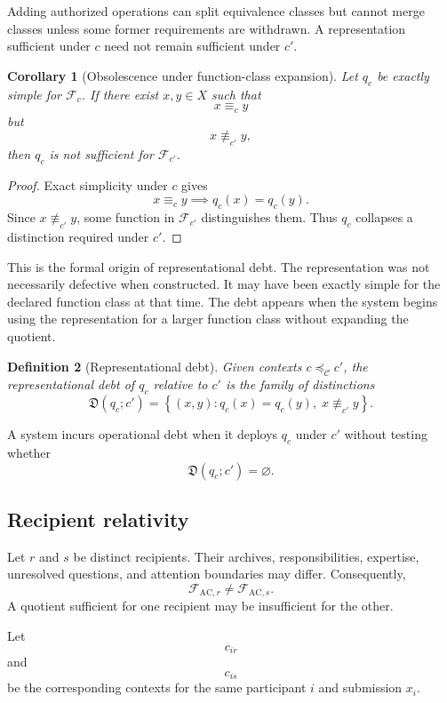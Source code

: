 \documentclass[11pt]{article}
\newtheorem{definition}{Definition}[section]
\newtheorem{corollary}[definition]{Corollary}
\theoremstyle{definition}
\newcommand{\F}{\mathcal{F}}
\begin{document}
Adding authorized operations can split equivalence classes but cannot merge classes unless some former requirements are withdrawn. A representation sufficient under \(c\) need not remain sufficient under \(c'\).

\begin{corollary}[Obsolescence under function-class expansion]
Let \(q_c\) be exactly simple for \(\F_c\). If there exist \(x,y\in X\) such that
\[
x\equiv_c y
\]
but
\[
x\not\equiv_{c'}y,
\]
then \(q_c\) is not sufficient for \(\F_{c'}\).
\end{corollary}

\begin{proof}
Exact simplicity under \(c\) gives
\[
x\equiv_c y
\implies
q_c(x)=q_c(y).
\]
Since \(x\not\equiv_{c'}y\), some function in \(\F_{c'}\) distinguishes them. Thus \(q_c\) collapses a distinction required under \(c'\).
\end{proof}

This is the formal origin of representational debt. The representation was not necessarily defective when constructed. It may have been exactly simple for the declared function class at that time. The debt appears when the system begins using the representation for a larger function class without expanding the quotient.

\begin{definition}[Representational debt]
Given contexts \(c\preceq_{\mathcal C}c'\), the representational debt of \(q_c\) relative to \(c'\) is the family of distinctions
\[
\mathfrak D(q_c;c')
=
\left\{
(x,y):
q_c(x)=q_c(y),
\;
x\not\equiv_{c'}y
\right\}.
\]
\end{definition}

A system incurs operational debt when it deploys \(q_c\) under \(c'\) without testing whether
\[
\mathfrak D(q_c;c')=\varnothing.
\]

\subsection{Recipient relativity}

Let \(r\) and \(s\) be distinct recipients. Their archives, responsibilities, expertise, unresolved questions, and attention boundaries may differ. Consequently,
\[
\F_{\mathrm{AC},r}
\neq
\F_{\mathrm{AC},s}.
\]
A quotient sufficient for one recipient may be insufficient for the other.

Let
\[
c_{ir}
\]
and
\[
c_{is}
\]
be the corresponding contexts for the same participant \(i\) and submission \(x_i\).
\end{document}
